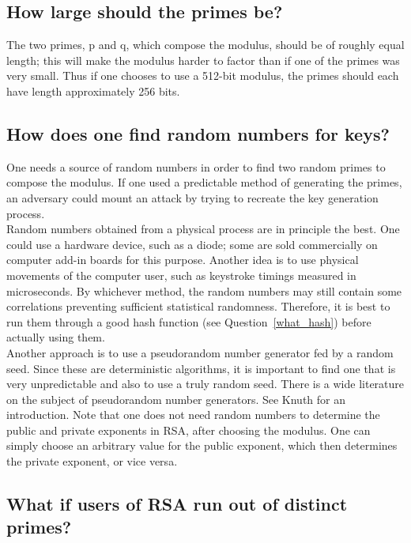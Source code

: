 \subsection{How large should the primes be?}

The two primes, p and q, which compose the modulus, should be of
roughly equal length; this will make the modulus harder to factor than
if one of the primes was very small. Thus if one chooses to use a
512-bit modulus, the primes should each have length approximately 256
bits.

\subsection{How does one find random numbers for keys?}

One needs a source of random numbers in order to find two random primes
to compose the modulus. If one used a predictable method of generating
the primes, an adversary could mount an attack by trying to recreate
the key generation process.\\

Random numbers obtained from a physical process are in principle the best.
One could use a hardware device, such as a diode; some are sold
commercially on computer add-in boards for this purpose. Another idea is to
use physical movements of the computer user, such as keystroke timings
measured in microseconds. By whichever method, the random numbers may still
contain some correlations preventing sufficient statistical randomness.
Therefore, it is best to run them through a good hash function (see
Question~\ref{what_hash}) before actually using them.\\

Another approach is to use a pseudorandom number generator fed by a
random seed. Since these are deterministic algorithms, it is important
to find one that is very unpredictable and also to use a truly random
seed. There is a wide literature on the subject of pseudorandom number
generators. See Knuth for an introduction. Note that one does not need
random numbers to determine the public and private exponents in RSA,
after choosing the modulus. One can simply choose an arbitrary value
for the public exponent, which then determines the private exponent, or
vice versa.

\subsection{What if users of RSA run out of distinct primes?}

